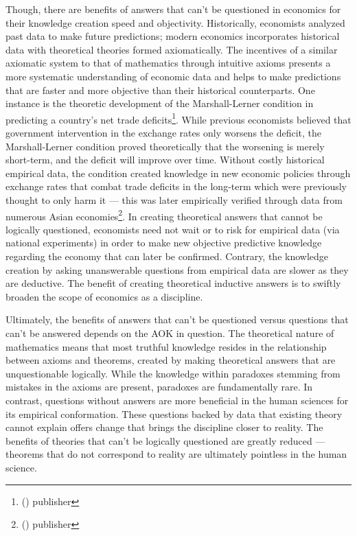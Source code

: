 \documentclass[a4paper,12pt]{article}
\newcommand{\citefoot}[1]{\footnote{\citeall{#1}}}
\newcommand{\citeall}[1]{\citeauth{#1} \citetitle{#1} (\citeyear{#1}) publisher \citelist{#1}{publisher}}
\begin{document}
Though, there are benefits of answers that can’t be questioned in economics for their knowledge creation speed and objectivity. Historically, economists analyzed past data to make future predictions; modern economics incorporates historical data with theoretical theories formed axiomatically. The incentives of a similar axiomatic system to that of mathematics through intuitive axioms presents a more systematic understanding of economic data and helps to make predictions that are faster and more objective than their historical counterparts. One instance is the theoretic development of the Marshall-Lerner condition in predicting a country’s net trade deficits\citefoot{mlcond}. While previous economists believed that government intervention in the exchange rates only worsens the deficit, the Marshall-Lerner condition proved theoretically that the worsening is merely short-term, and the deficit will improve over time. Without costly historical empirical data, the condition created knowledge in new economic policies through exchange rates that combat trade deficits in the long-term which were previously thought to only harm it --- this was later empirically verified through data from numerous Asian economies\citefoot{hsing_2010}. In creating theoretical answers that cannot be logically questioned, economists need not wait or to risk for empirical data (via national experiments) in order to make new objective predictive knowledge regarding the economy that can later be confirmed. Contrary, the knowledge creation by asking unanswerable questions from empirical data are slower as they are deductive. The benefit of creating theoretical inductive answers is to swiftly broaden the scope of economics as a discipline.


Ultimately, the benefits of answers that can’t be questioned versus questions that can’t be answered depends on the AOK in question. The theoretical nature of mathematics means that most truthful knowledge resides in the relationship between axioms and theorems, created by making theoretical answers that are unquestionable logically. While the knowledge within paradoxes stemming from mistakes in the axioms are present, paradoxes are fundamentally rare. In contrast, questions without answers are more beneficial in the human sciences for its empirical conformation. These questions backed by data that existing theory cannot explain offers change that brings the discipline closer to reality. The benefits of theories that can’t be logically questioned are greatly reduced --- theorems that do not correspond to reality are ultimately pointless in the human science.
\end{document}
